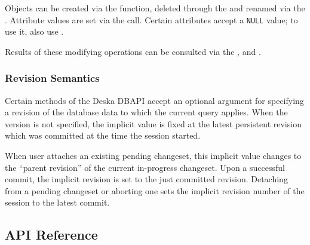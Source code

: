 \documentclass{article}
\begin{document}
Objects can be created via the  function, deleted through the  and
renamed via the .  Attribute values are set via the  call.
Certain attributes accept a {\tt NULL} value; to use it, also use .

Results of these modifying operations can be consulted via the ,
 and .

\subsubsection{Revision Semantics}
\label{sec:api-revision-semantics}

Certain methods of the Deska DBAPI accept an optional argument for specifying a revision of the database data to which
the current query applies.  When the version is not specified, the implicit value is fixed at the latest persistent
revision which was committed at the time the session started.

When user attaches an existing pending changeset, this implicit value changes to the ``parent revision'' of the
current in-progress changeset.  Upon a successful commit, the implicit revision is set to the just committed revision.
Detaching from a pending changeset or aborting one sets the implicit revision number of the session to the latest
commit.

\subsection{API Reference}

\newcommand{\deskaFunc}[5]
{\paragraph{#1}\label{sec:api-ref-#1}

{#4}

{#5}

\subparagraph{Sample JSON input} {\tt \{"command": "{#1}"{#2}\}}

\subparagraph{Sample JSON output} {\tt \{"response": "{#1}"{#2}\ifstrequal{#3}{}{}{, "{#1}": {#3}}\}}

}

\setcounter{secnumdepth}{4}
\end{document}
